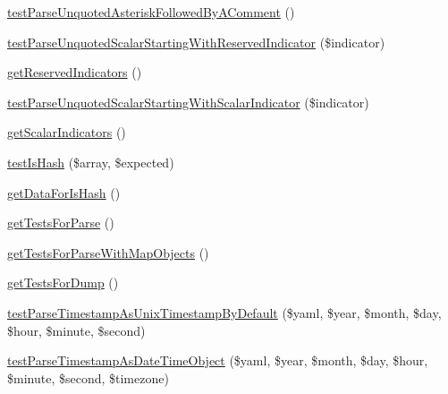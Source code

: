 \begin{DoxyCompactItemize}
\item 
\mbox{\hyperlink{class_symfony_1_1_component_1_1_yaml_1_1_tests_1_1_inline_test_a80aa0b9d832972aba33b43989abc7e6b}{test\+Parse\+Unquoted\+Asterisk\+Followed\+By\+A\+Comment}} ()
\item 
\mbox{\hyperlink{class_symfony_1_1_component_1_1_yaml_1_1_tests_1_1_inline_test_a1479d85f417e29ca1775e481240c4abf}{test\+Parse\+Unquoted\+Scalar\+Starting\+With\+Reserved\+Indicator}} (\$indicator)
\item 
\mbox{\hyperlink{class_symfony_1_1_component_1_1_yaml_1_1_tests_1_1_inline_test_a0377540bc3e5ab53a9167585eb7c2a9f}{get\+Reserved\+Indicators}} ()
\item 
\mbox{\hyperlink{class_symfony_1_1_component_1_1_yaml_1_1_tests_1_1_inline_test_aebef10b48a116c62c26f0d697a63c78d}{test\+Parse\+Unquoted\+Scalar\+Starting\+With\+Scalar\+Indicator}} (\$indicator)
\item 
\mbox{\hyperlink{class_symfony_1_1_component_1_1_yaml_1_1_tests_1_1_inline_test_a1d7fb21fda16047b3e7feeae4f02acd3}{get\+Scalar\+Indicators}} ()
\item 
\mbox{\hyperlink{class_symfony_1_1_component_1_1_yaml_1_1_tests_1_1_inline_test_a1c0197a8b2cbc5d7c385d75d03786020}{test\+Is\+Hash}} (\$array, \$expected)
\item 
\mbox{\hyperlink{class_symfony_1_1_component_1_1_yaml_1_1_tests_1_1_inline_test_a4fbd31ebf70da736a9d0bfc005a71f91}{get\+Data\+For\+Is\+Hash}} ()
\item 
\mbox{\hyperlink{class_symfony_1_1_component_1_1_yaml_1_1_tests_1_1_inline_test_a01ae76e09b11e0f1d94563d5b0215f41}{get\+Tests\+For\+Parse}} ()
\item 
\mbox{\hyperlink{class_symfony_1_1_component_1_1_yaml_1_1_tests_1_1_inline_test_a65333e6c8def574f2dcf2712372094e1}{get\+Tests\+For\+Parse\+With\+Map\+Objects}} ()
\item 
\mbox{\hyperlink{class_symfony_1_1_component_1_1_yaml_1_1_tests_1_1_inline_test_a5880a2f51da04a8eb3e61d16680634fd}{get\+Tests\+For\+Dump}} ()
\item 
\mbox{\hyperlink{class_symfony_1_1_component_1_1_yaml_1_1_tests_1_1_inline_test_a899e73c1a99a8a451b6d29f01c4288b3}{test\+Parse\+Timestamp\+As\+Unix\+Timestamp\+By\+Default}} (\$yaml, \$year, \$month, \$day, \$hour, \$minute, \$second)
\item 
\mbox{\hyperlink{class_symfony_1_1_component_1_1_yaml_1_1_tests_1_1_inline_test_ae5c53f91921b79d69bb8c5fc831e80e2}{test\+Parse\+Timestamp\+As\+Date\+Time\+Object}} (\$yaml, \$year, \$month, \$day, \$hour, \$minute, \$second, \$timezone)

\end{DoxyCompactItemize}

